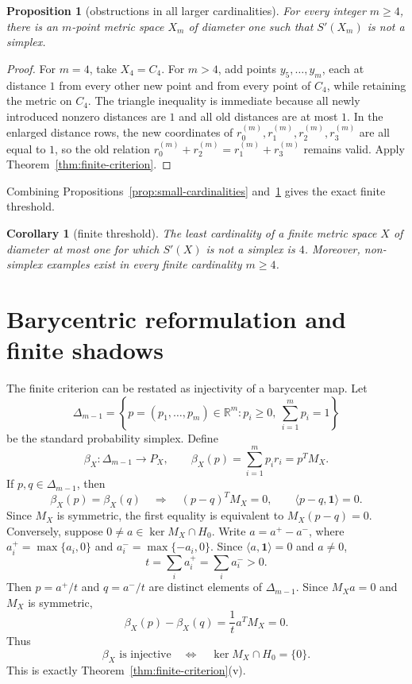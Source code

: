 \documentclass{proc-l}
\numberwithin{equation}{section}
\newtheorem{proposition}[theorem]{Proposition}
\newtheorem{corollary}[theorem]{Corollary}
\theoremstyle{definition}
\theoremstyle{remark}
\newcommand{\R}{\mathbb R}
\newcommand{\one}{\mathbf 1}
\begin{document}
\begin{proposition}[obstructions in all larger cardinalities]\label{prop:all-larger}
For every integer \(m\ge4\), there is an \(m\)-point metric space \(X_m\) of
diameter one such that \(S'(X_m)\) is not a simplex.
\end{proposition}

\begin{proof}
For \(m=4\), take \(X_4=C_4\).  For \(m>4\), add points \(y_5,\ldots,y_m\), each at
distance \(1\) from every other new point and from every point of \(C_4\), while
retaining the metric on \(C_4\).  The triangle inequality is immediate because
all newly introduced nonzero distances are \(1\) and all old distances are at
most \(1\).  In the enlarged distance rows, the new coordinates of
\(r_0^{(m)},r_1^{(m)},r_2^{(m)},r_3^{(m)}\) are all equal to \(1\), so the old
relation \(r_0^{(m)}+r_2^{(m)}=r_1^{(m)}+r_3^{(m)}\) remains valid.  Apply
Theorem~\ref{thm:finite-criterion}.
\end{proof}

Combining Propositions~\ref{prop:small-cardinalities} and~\ref{prop:all-larger} gives the exact
finite threshold.

\begin{corollary}[finite threshold]\label{cor:threshold}
The least cardinality of a finite metric space \(X\) of diameter at most one
for which \(S'(X)\) is not a simplex is \(4\).  Moreover, non-simplex examples
exist in every finite cardinality \(m\ge4\).
\end{corollary}

\section{Barycentric reformulation and finite shadows}
\label{sec:barycentric-finite}

The finite criterion can be restated as injectivity of a barycenter map.  Let
\[
        \Delta_{m-1}=\left\{p=(p_1,\ldots,p_m)\in\R^m:
        p_i\ge0,\ \sum_{i=1}^m p_i=1\right\}
\]
be the standard probability simplex.  Define
\[
        \beta_X:\Delta_{m-1}\longrightarrow P_X,
        \qquad
        \beta_X(p)=\sum_{i=1}^m p_i r_i=p^T M_X.
\]
If \(p,q\in\Delta_{m-1}\), then
\[
        \beta_X(p)=\beta_X(q)
        \quad\Longrightarrow\quad
        (p-q)^T M_X=0,
        \qquad
        \langle p-q,\one\rangle=0.
\]
Since \(M_X\) is symmetric, the first equality is equivalent to
\(M_X(p-q)=0\).  Conversely, suppose \(0\ne a\in\ker M_X\cap H_0\).  Write
\(a=a^+-a^-\), where \(a_i^+=\max\{a_i,0\}\) and
\(a_i^-=\max\{-a_i,0\}\).  Since \(\langle a,\one\rangle=0\) and \(a\ne0\),
\[
        t=\sum_i a_i^+=\sum_i a_i^->0.
\]
Then \(p=a^+/t\) and \(q=a^-/t\) are distinct elements of \(\Delta_{m-1}\).  Since
\(M_Xa=0\) and \(M_X\) is symmetric,
\[
        \beta_X(p)-\beta_X(q)=\frac1t a^T M_X=0.
\]
Thus
\begin{equation}\label{eq:bary-kernel}
        \beta_X\text{ is injective}
        \quad\Longleftrightarrow\quad
        \ker M_X\cap H_0=\{0\}.
\end{equation}
This is exactly Theorem~\ref{thm:finite-criterion}\textup{(v)}.
\end{document}

